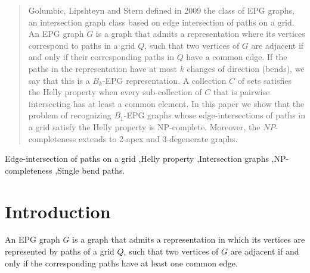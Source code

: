 \documentclass[9pt]{entcs}
\begin{document}
\begin{frontmatter}


\begin{abstract}
Golumbic, Lipshteyn and Stern defined in 2009 the class of EPG graphs, an intersection graph class  based on edge intersection of paths on a grid. An EPG graph $G$ is a graph that admits a representation where its vertices correspond to paths in a grid $Q$, such that two vertices of $G$ are adjacent if and only if their corresponding paths in $Q$ have a common edge. If the paths in the representation have at most $k$ changes of direction  (bends), we say that this is a  $B_k$-EPG representation. A collection $C$ of sets satisfies the Helly property when every sub-collection of $C$ that is pairwise intersecting has at least a common element. In this paper we show that the problem of recognizing $B_1$-EPG graphs whose edge-intersections of paths in a grid satisfy the Helly property is NP-complete. Moreover, the $NP$-completeness extends to 2-apex and 3-degenerate graphs.
\end{abstract}

\begin{keyword}
Edge-intersection of paths on a grid \sep Helly property \sep Intersection graphs \sep NP-completeness \sep Single bend paths.


\end{keyword}

\end{frontmatter}


\section{Introduction}
An EPG graph $G$ is a graph that admits a representation in which its vertices are represented by paths of a grid $Q$, such that two vertices of $G$ are adjacent if and only if the corresponding paths have at least one common edge. 
\end{document}
